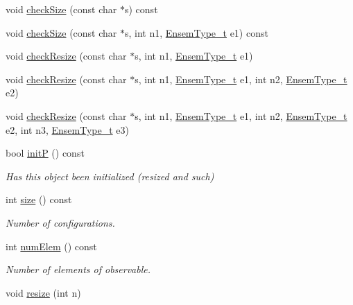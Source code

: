 \begin{DoxyCompactItemize}
void \mbox{\hyperlink{classENSEM_1_1Ensem_a32978c0e251d9731bdb83c6069eb059d}{check\+Size}} (const char $\ast$s) const
\item 
void \mbox{\hyperlink{classENSEM_1_1Ensem_a4c06fadea7b637572de2347739b78004}{check\+Size}} (const char $\ast$s, int n1, \mbox{\hyperlink{namespaceENSEM_a2dc2c4a26884f343471e52f23479ddbe}{Ensem\+Type\+\_\+t}} e1) const
\item 
void \mbox{\hyperlink{classENSEM_1_1Ensem_a1cebe5f8cc3d849d6b4dc7d9d10c636b}{check\+Resize}} (const char $\ast$s, int n1, \mbox{\hyperlink{namespaceENSEM_a2dc2c4a26884f343471e52f23479ddbe}{Ensem\+Type\+\_\+t}} e1)
\item 
void \mbox{\hyperlink{classENSEM_1_1Ensem_acb139b6e03db52a9190de9ea4830addb}{check\+Resize}} (const char $\ast$s, int n1, \mbox{\hyperlink{namespaceENSEM_a2dc2c4a26884f343471e52f23479ddbe}{Ensem\+Type\+\_\+t}} e1, int n2, \mbox{\hyperlink{namespaceENSEM_a2dc2c4a26884f343471e52f23479ddbe}{Ensem\+Type\+\_\+t}} e2)
\item 
void \mbox{\hyperlink{classENSEM_1_1Ensem_a893d2925ef3c942b9d25b0a6e6db619c}{check\+Resize}} (const char $\ast$s, int n1, \mbox{\hyperlink{namespaceENSEM_a2dc2c4a26884f343471e52f23479ddbe}{Ensem\+Type\+\_\+t}} e1, int n2, \mbox{\hyperlink{namespaceENSEM_a2dc2c4a26884f343471e52f23479ddbe}{Ensem\+Type\+\_\+t}} e2, int n3, \mbox{\hyperlink{namespaceENSEM_a2dc2c4a26884f343471e52f23479ddbe}{Ensem\+Type\+\_\+t}} e3)
\item 
bool \mbox{\hyperlink{classENSEM_1_1Ensem_af76aaa7b0f354006786dce06dc04669d}{initP}} () const
\begin{DoxyCompactList}\small\item\em Has this object been initialized (resized and such) \end{DoxyCompactList}\item 
int \mbox{\hyperlink{classENSEM_1_1Ensem_ae8cf08459492240dcab13d4ab3a21216}{size}} () const
\begin{DoxyCompactList}\small\item\em Number of configurations. \end{DoxyCompactList}\item 
int \mbox{\hyperlink{classENSEM_1_1Ensem_a495a563176192200eca2f16978158750}{num\+Elem}} () const
\begin{DoxyCompactList}\small\item\em Number of elements of observable. \end{DoxyCompactList}\item 
void \mbox{\hyperlink{classENSEM_1_1Ensem_ae43aa68aaca92143baffe83310657f4a}{resize}} (int n)

\end{DoxyCompactItemize}
